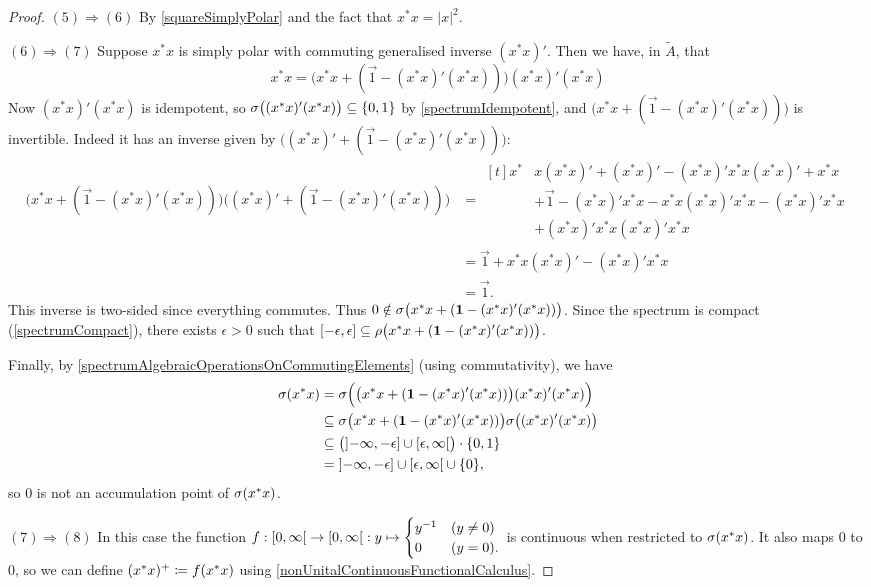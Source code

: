 \begin{proof}
$(5) \Rightarrow (6)$ By \ref{squareSimplyPolar} and the fact that $x^*x = |x|^2$.

$(6) \Rightarrow (7)$ Suppose $x^*x$ is simply polar with commuting generalised inverse $(x^*x)'$. Then we have, in $\widetilde{A}$, that
\[ x^*x = \big(x^*x + (\vec{1} - (x^*x)'(x^*x))\big)(x^*x)'(x^*x) \]
Now $(x^*x)'(x^*x)$ is idempotent, so $\sigma\big((x^*x)'(x^*x)\big) \subseteq \{0,1\}$ by \ref{spectrumIdempotent}, and $\big(x^*x + (\vec{1} - (x^*x)'(x^*x))\big)$ is invertible. Indeed it has an inverse given by $\big((x^*x)' + (\vec{1} - (x^*x)'(x^*x))\big)$:
\begin{align*}
\big(x^*x + (\vec{1} - (x^*x)'(x^*x))\big)\big((x^*x)' + (\vec{1} - (x^*x)'(x^*x))\big) &= \begin{aligned}[t]x^*&x(x^*x)' + (x^*x)' - (x^*x)'x^*x(x^*x)' + x^*x \\
&+ \vec{1} - (x^*x)'x^*x - x^*x(x^*x)'x^*x - (x^*x)'x^*x \\
&+ (x^*x)'x^*x(x^*x)'x^*x\end{aligned} \\
&= \vec{1} + x^*x(x^*x)' - (x^*x)'x^*x \\
&= \vec{1}.
\end{align*}
This inverse is two-sided since everything commutes. Thus $0\notin \sigma\big(x^*x + (\boldsymbol{\mathrm{1}} - (x^*x)'(x^*x))\big)$. Since the spectrum is compact (\ref{spectrumCompact}), there exists $\epsilon >0$ such that $\interval{-\epsilon, \epsilon} \subseteq \res\big(x^*x + (\vec{1} - (x^*x)'(x^*x))\big)$. 

Finally, by \ref{spectrumAlgebraicOperationsOnCommutingElements} (using commutativity), we have
\begin{align*}
\spec(x^*x) &= \spec\Big(\big(x^*x + (\vec{1} - (x^*x)'(x^*x))\big)(x^*x)'(x^*x)\Big) \\
&\subseteq \spec\big(x^*x + (\vec{1} - (x^*x)'(x^*x))\big)\spec\big((x^*x)'(x^*x)\big) \\
&\subseteq \big(\interval[oc]{-\infty, -\epsilon} \cup \interval[co]{\epsilon, \infty}\big)\cdot \{0,1\} \\
&= \interval[oc]{-\infty, -\epsilon} \cup \interval[co]{\epsilon, \infty} \cup \{0\},
\end{align*}
so $0$ is not an accumulation point of $\sigma(x^*x)$.

$(7) \Rightarrow (8)$ In this case the function $f: \interval[co]{0,\infty} \to \interval[co]{0,\infty}: y \mapsto \begin{cases}
y^{-1} & (y \neq 0) \\ 0 & (y = 0).
\end{cases}$ is continuous when restricted to $\sigma(x^*x)$. It also maps $0$ to $0$, so we can define $(x^*x)^+ \coloneqq f(x^*x)$ using \ref{nonUnitalContinuousFunctionalCalculus}.


\end{proof}
